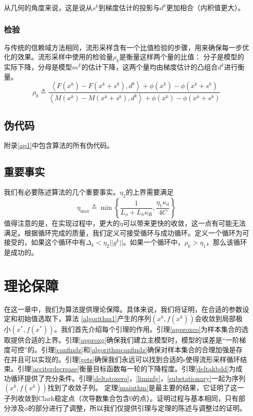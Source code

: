 \documentclass[macfonts]{njuthesis}
\begin{document}
从几何的角度来说，这是说从$s^k$到梯度估计的投影与$d^k$更加相合（内积值更大）。

\subsection{检验}
与传统的信赖域方法相同，流形采样含有一个比值检验的步骤，用来确保每一步优化的效果。流形采样中使用的检验量$\rho_k$是衡量这样两个量的比值： 分子是模型的实际下降，分母是模型$m^F$的估计下降，这两个量均由梯度估计的凸组合$d^k$进行衡量。
\begin{equation}
\label{rho}
\rho_{k} \triangleq \frac{\left\langle F\left(x^{k}\right)-F\left(x^{k}+s^{k}\right), d^{k}\right\rangle+\phi(x^k)-\phi(x^k+s^k)}{\left\langle M\left(x^{k}\right)-M\left(x^{k}+s^{k}\right), d^{k}\right\rangle+\phi(x^k)-\phi(x^k+s^k)}
\end{equation}

\section{伪代码}
附录\ref{ap1}中包含算法的所有伪代码。


\section{重要事实}
我们有必要陈述算法的几个重要事实。$\eta_2$的上界需要满足
\begin{equation}
\label{etamax}
\eta_{\max } \triangleq \min \left\{\frac{1}{L_{\phi}+L_{h} \kappa_{\mathrm{H}}}, \frac{\eta_{1} \kappa_{\mathrm{d}}}{4 C}\right\}
\end{equation}
值得注意的是，在实现过程中，更大的$\eta$可以带来更快的收敛，这一点有可能无法满足。根据循环完成的质量，我们定义可接受循环与成功循环。定义一个循环为可接受的，如果这个循环中有$\Delta_k<\eta_2||g^k||$。如果一个循环中，$ \rho_k>\eta_1$，那么该循环是成功的。






\chapter{理论保障}
在这一章中，我们为算法提供理论保障。具体来说，我们将证明，在合适的参数设定和初始值选取下，算法 \ref{algorithm1}产生的序列$(x^k, f(x^k))$会收敛到局部极小$(x^*,f(x^*))$。我们首先介绍每个引理的作用。引理\ref{approxco}为样本集合的选取提供合适的上界。引理\ref{approxg}确保我们建立主模型时，模型的误差是“一阶梯度可控”的。引理\ref{canfindz}和\ref{algorithmcanfindz}确保对样本集合的合理加强是存在并且可以实现的。引理\ref{gets}确保我们永远可以找到合适的s使得流形采样循环结束。引理\ref{acciterdecrease}衡量目标函数每一轮的下降程度。引理\ref{deltakbdd}为成功循环提供了充分条件。引理\ref{deltatozero}，\ref{liminfg}，\ref{substationary}一起为序列$(x^k, f(x^k))$找到了收敛子列。 定理\ref{mainthm}是最主要的结果，它证明了这一子列收敛到Clark稳定点（次导数集合包含0的点）。证明过程与\cite{manifold}基本相同，只有部分涉及$\phi$的部分进行了调整，所以我们仅提供引理与定理的陈述与调整过的证明。
\end{document}
